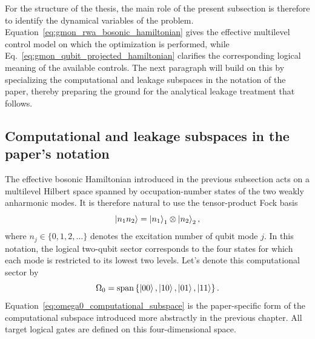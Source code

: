 For the structure of the thesis, the main role of the present subsection is therefore to identify the dynamical variables of the problem. Equation~\eqref{eq:gmon_rwa_bosonic_hamiltonian} gives the effective multilevel control model on which the optimization is performed, while Eq.~\eqref{eq:gmon_qubit_projected_hamiltonian} clarifies the corresponding logical meaning of the available controls. The next paragraph will build on this by specializing the computational and leakage subspaces in the notation of the paper, thereby preparing the ground for the analytical leakage treatment that follows.



\subsection{Computational and leakage subspaces in the paper's notation}
\label{subsec:gmon_subspaces_notation}

The effective bosonic Hamiltonian introduced in the previous subsection acts on a multilevel Hilbert space spanned by occupation-number states of the two weakly anharmonic modes. It is therefore natural to use the tensor-product Fock basis
\begin{equation}
\ket{n_1 n_2}
=
\ket{n_1}_1 \otimes \ket{n_2}_2,
\label{eq:fock_basis_two_qubit}
\end{equation}
where $n_j\in\{0,1,2,\dots\}$ denotes the excitation number of qubit mode $j$. In this notation, the logical two-qubit sector corresponds to the four states for which each mode is restricted to its lowest two levels. Let's denote this computational sector by
\begin{equation}
\Omega_0
=
\mathrm{span}
\left\{
\ket{00},\ket{10},\ket{01},\ket{11}
\right\}.
\label{eq:omega0_computational_subspace}
\end{equation}
Equation~\eqref{eq:omega0_computational_subspace} is the paper-specific form of the computational subspace introduced more abstractly in the previous chapter. All target logical gates are defined on this four-dimensional space.

